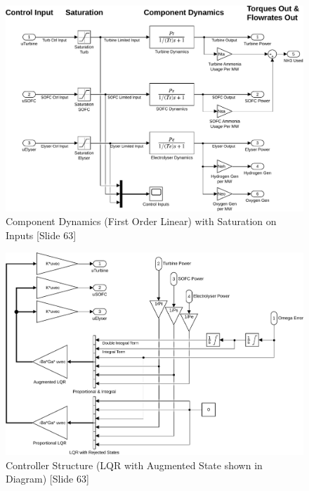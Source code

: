 \begin{figure}[p]
\centering
        \includegraphics[scale=0.7]{images/plant2/comp.pdf}
    \caption{Component Dynamics (First Order Linear) with Saturation on Inputs [Slide 63]}
        \label{fig:comp}
\end{figure}
\begin{figure}[p]
\centering
        \includegraphics[scale=0.7]{images/plant2/ctrl.pdf}
    \caption{Controller Structure (LQR with Augmented State shown in Diagram) [Slide 63]}
        \label{fig:ctrl}
\end{figure}



